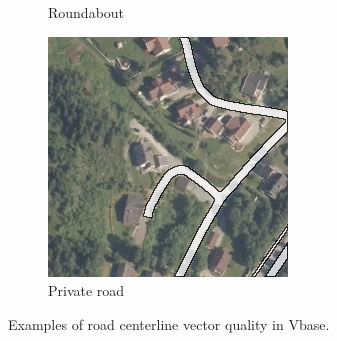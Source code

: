 \begin{figure}[h]
\begin{subfigure}{0.31\textwidth}
\caption{Roundabout} \label{fig:norwegian_roads_roundabout_vbase}
\end{subfigure}
\hspace*{\fill} %
\begin{subfigure}{0.31\textwidth}
\includegraphics[width=\linewidth]{figs/datasets/nor_examples/1157_missing_vbase.png}
\caption{Private road} \label{fig:norwegian_roads_missing_vbase}
\end{subfigure}
\hspace*{\fill} %
\caption{Examples of road centerline vector quality in Vbase.} \label{fig:norwegian_roads_examples_vbase}
\end{figure}

